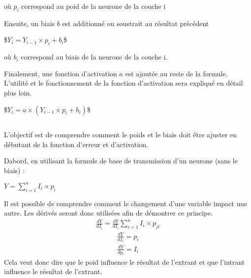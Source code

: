\documentclass[letterpaper,10pt,french]{sphinxmanual}
\begin{document}
où \(p_{i}\) correspond au poid de la neurone de la couche i

Ensuite, un biais \(b\) est additionné ou soustrait au résultat précédent

\$\(Y_i = Y_{i-1}\times p_{i} + b_i\)\$ 

où \(b_i\) correspond au biais de la neurone de la couche i.

Finalement, une fonction d’activation \(a\) est ajoutée au reste de la formule. L’utilité et le fonctionnement de la fonction d’activation sera expliqué en détail plus loin.

\$\(Y_i = a\times(Y_{i-1}\times p_{i} + b_i)\)\$ 


\subsection{}
\label{\detokenize{OCR_SAM:back-propagation}}
L’objectif est de comprendre comment le poids et le biais doit être ajuster en débutant de la fonction d’erreur et d’activation.

Dabord, en utilisant la formule de base de transmission d’un neurone (sans le biais) :

\(Y = \sum_{i=1}^{n} I_i \times p_i \)

Il est possible de comprendre comment le changement d’une variable impact une autre. Les dérivés seront donc utilisées afin de démontrer ce principe.
\begin{equation*}
\begin{split}\frac{dY}{dI_i}=\frac{dY}{dI_i}\sum_{i=1}^{n} I_i \times p_{ji} 
\end{split}
\end{equation*}\begin{equation*}
\begin{split}\frac{dY}{dI_i} = p_i\end{split}
\end{equation*}\begin{equation*}
\begin{split}\frac{dY}{dp_i} = I_i\end{split}
\end{equation*}
Cela veut donc dire que le poid influence le résultat de l’extrant et que l’intrant influence le résultat de l’extrant.
\end{document}
